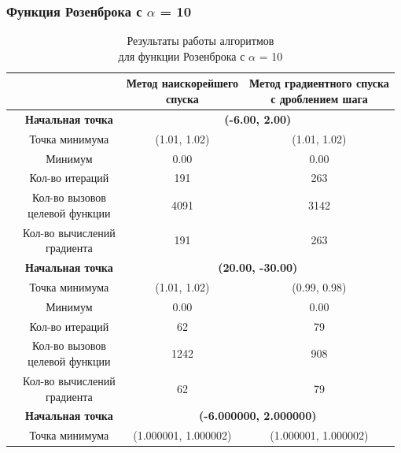             \subsubsection{Функция Розенброка с $\alpha$ = 10}

\begin{table}[H]
        \centering
        \vspace*{-1.5em}
        \caption{Результаты работы алгоритмов\\для функции Розенброка с $\alpha$ = 10}
        \footnotesize
        \begin{tabular}{|c|c|c|c|}
        \hline
        & &\makecell{Метод наискорейшего\\спуска} &\makecell{Метод градиентного спуска\\с дроблением шага} \\
        \hline
	\multirow{10}{*}{\rotatebox[origin=c]{90}{$\varepsilon = 0.01$}}&\textbf{Начальная точка} &\multicolumn{2}{c|}{\textbf{(-6.00, 2.00)}}\\
	\cline{2-4}
	&Точка минимума &(1.01, 1.02) &(1.01, 1.02) \\ 
	\cline{2-4}
	&Минимум &0.00 &0.00 \\ 
	\cline{2-4}
	&Кол-во итераций &191 &263 \\ 
	\cline{2-4}
	&\makecell{Кол-во вызовов\\целевой функции} &4091 &3142 \\ 
	\cline{2-4}
	&\makecell{Кол-во вычислений\\градиента} &191 &263 \\ 
	\cline{2-4}
\cline{2-4}&\textbf{Начальная точка} &\multicolumn{2}{c|}{\textbf{(20.00, -30.00)}}\\
	\cline{2-4}
	&Точка минимума &(1.01, 1.02) &(0.99, 0.98) \\ 
	\cline{2-4}
	&Минимум &0.00 &0.00 \\ 
	\cline{2-4}
	&Кол-во итераций &62 &79 \\ 
	\cline{2-4}
	&\makecell{Кол-во вызовов\\целевой функции} &1242 &908 \\ 
	\cline{2-4}
	&\makecell{Кол-во вычислений\\градиента} &62 &79 \\ 
	\cline{2-4}
	\hline
	\multirow{10}{*}{\rotatebox[origin=c]{90}{$\varepsilon = 1e-06$}}&\textbf{Начальная точка} &\multicolumn{2}{c|}{\textbf{(-6.000000, 2.000000)}}\\
	\cline{2-4}
	&Точка минимума &(1.000001, 1.000002) &(1.000001, 1.000002) \\ 

\end{tabular}
\end{table}
